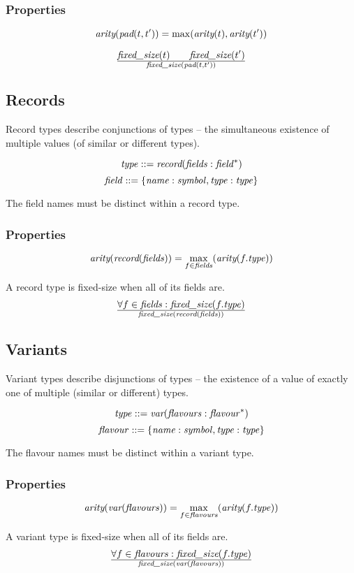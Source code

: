 \documentclass[a4paper]{report}
\newcommand\arity{{\ensuremath\textit{arity}}}
\newcommand\fixedsize{{\ensuremath\textit{fixed\_size}}}
\newcommand\tyVar{{\ensuremath\textit{var}}}
\newcommand\tyPad{{\ensuremath\textit{pad}}}
\newcommand\tyRecord{{\ensuremath\textit{record}}}
\begin{document}
\subsubsection*{Properties}
$$ \arity(\tyPad(t, t')) = \max(\arity(t), \arity(t'))$$


$${\fixedsize(t) \qquad \fixedsize(t')}
 \over
\fixedsize(\tyPad(t, t'))$$

\subsection{Records}
Record types describe conjunctions of types -- the simultaneous
existence of multiple values (of similar or different types).

$$\it type ::= \tyRecord(fields : field^*)$$
$$\it field ::= \{name:symbol, type:type\}$$

The field names must be distinct within a record type.

\subsubsection*{Properties}

$$
\arity(\tyRecord({\it fields})) = \max_{f \in {\it fields}}(\arity(f.{\it type}))
$$


A record type is fixed-size when all of its fields are.
$${\forall f \in {\it fields} : \fixedsize(f.{\it type})} \over
  \fixedsize(\tyRecord({\it fields}))
$$

\subsection{Variants}
Variant types describe disjunctions of types -- the
existence of a value of exactly one of multiple (similar or different) types.

$$\it type ::= \tyVar(flavours : flavour^*)$$
$$\it flavour ::= \{name:symbol, type:type\}$$

The flavour names must be distinct within a variant type.

\subsubsection*{Properties}

$$
\arity(\tyVar({\it flavours})) = \max_{f \in {\it flavours}}(\arity(f.{\it type}))
$$


A variant type is fixed-size when all of its fields are.
$${\forall f \in {\it flavours} : \fixedsize(f.{\it type})} \over
  \fixedsize(\tyVar({\it flavours}))
$$
\end{document}
